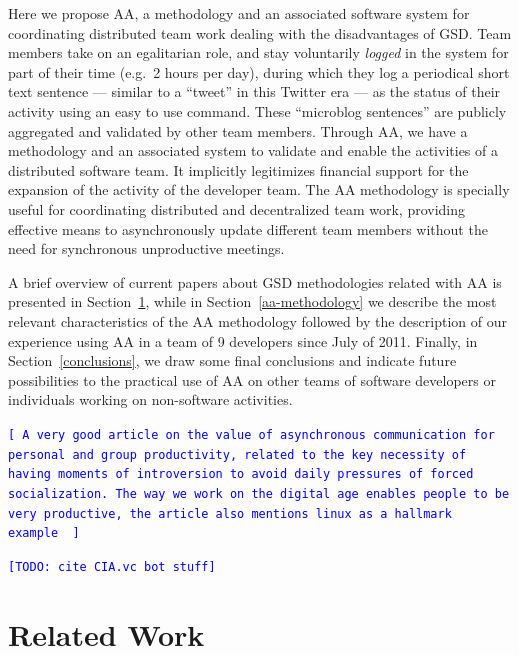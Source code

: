 \documentclass[letterpaper]{article}
\newcommand{\indraftnote}[1]{\textcolor{blue}{\texttt{\footnotesize[#1]}}}
\newcommand{\todo}[1]{\indraftnote{todo: #1}}
\begin{document}
Here we propose AA, a methodology and an associated software system
for coordinating distributed team work dealing with the disadvantages
of GSD. Team members take on an egalitarian role, and stay
voluntarily \textit{logged} in the system for part of their time
(e.g.\ 2 hours per day), during which they log a periodical short text
sentence --- similar to a ``tweet'' in this Twitter era --- as the
status of their activity using an easy to use command. These
``microblog sentences'' are publicly aggregated and validated by other
team members. Through AA, we have a methodology and an associated
system to validate and enable the activities of a distributed software
team. It implicitly legitimizes financial support for the expansion of
the activity of the developer team. The AA methodology is specially
useful for coordinating distributed and decentralized team work,
providing effective means to asynchronously update different team
members without the need for synchronous unproductive meetings.


A brief overview of current papers about GSD methodologies related with
AA is presented in Section~\ref{related-work}, while in
Section~\ref{aa-methodology} we describe the most relevant
characteristics of the AA methodology followed by the description of
our experience using AA in a team of 9 developers since July of
2011. Finally, in Section~\ref{conclusions}, we draw some final
conclusions and indicate future possibilities to the
practical use of AA on other teams of software developers or
individuals working on non-software activities.

\indraftnote{
A very good article on the value of asynchronous communication for personal
and group productivity, related to the key necessity of having moments of
introversion to avoid daily pressures of forced socialization. The way we work
on the digital age enables people to be very productive, the article also
mentions linux as a hallmark example~\cite{Thompson:Wired:2012}
}

\indraftnote{TODO: cite CIA.vc bot stuff}

\section{Related Work}
\label{related-work}

\end{document}
